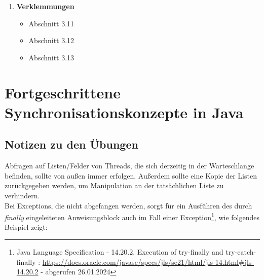 \begin{tcolorbox}[colback=white!20,color=white]
\begin{enumerate}
        \item \textbf{Verklemmungen}
        \begin{itemize}
            \item[] Abschnitt 3.11
            \item[] Abschnitt 3.12
            \item[] Abschnitt 3.13
        \end{itemize}

    \end{enumerate}
\end{tcolorbox}

\newpage


\section{Fortgeschrittene Synchronisationskonzepte in Java}





\subsection{Notizen zu den Übungen}

Abfragen auf Listen/Felder von Threads, die sich derzeitig in der Warteschlange befinden, sollte von außen immer  erfolgen.
Außerdem sollte eine Kopie der Listen zurückgegeben werden, um Manipulation an der tatsächlichen Liste zu verhindern.\\

\noindent
Bei Exceptions, die nicht abgefangen werden, sorgt  für ein Ausführen des durch \textit{finally} eingeleiteten Anweisungsblock auch im Fall einer Exception\footnote{
    Java Language Specification - 14.20.2. Execution of try-finally and try-catch-finally : \url{https://docs.oracle.com/javase/specs/jls/se21/html/jls-14.html#jls-14.20.2} - abgerufen 26.01.2024
}, wie folgendes Beispiel zeigt:

